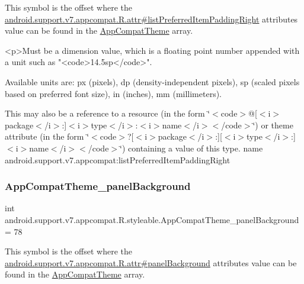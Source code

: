 This symbol is the offset where the \hyperlink{classandroid_1_1support_1_1v7_1_1appcompat_1_1R_1_1attr_a84cb41529bc5b6350af5f41bbea4e8cd}{android.\+support.\+v7.\+appcompat.\+R.\+attr\#list\+Preferred\+Item\+Padding\+Right} attribute\textquotesingle{}s value can be found in the \hyperlink{classandroid_1_1support_1_1v7_1_1appcompat_1_1R_1_1styleable_a5c42f89e8a410c323be34208d75c430b}{App\+Compat\+Theme} array.

\begin{DoxyVerb}      <p>Must be a dimension value, which is a floating point number appended with a unit such as "<code>14.5sp</code>".
\end{DoxyVerb}
 Available units are\+: px (pixels), dp (density-\/independent pixels), sp (scaled pixels based on preferred font size), in (inches), mm (millimeters). 

This may also be a reference to a resource (in the form \char`\"{}$<$code$>$@\mbox{[}$<$i$>$package$<$/i$>$\+:\mbox{]}$<$i$>$type$<$/i$>$\+:$<$i$>$name$<$/i$>$$<$/code$>$\char`\"{}) or theme attribute (in the form \char`\"{}$<$code$>$?\mbox{[}$<$i$>$package$<$/i$>$\+:\mbox{]}\mbox{[}$<$i$>$type$<$/i$>$\+:\mbox{]}$<$i$>$name$<$/i$>$$<$/code$>$\char`\"{}) containing a value of this type.  name android.\+support.\+v7.\+appcompat\+:list\+Preferred\+Item\+Padding\+Right \mbox{\label{classandroid_1_1support_1_1v7_1_1appcompat_1_1R_1_1styleable_aa555e7cf895108969bdf9dd9d68743be}} 
\subsubsection{\texorpdfstring{App\+Compat\+Theme\+\_\+panel\+Background}{AppCompatTheme\_panelBackground}}
{\footnotesize\ttfamily int android.\+support.\+v7.\+appcompat.\+R.\+styleable.\+App\+Compat\+Theme\+\_\+panel\+Background = 78\hspace{0.3cm}{\ttfamily [static]}}

This symbol is the offset where the \hyperlink{classandroid_1_1support_1_1v7_1_1appcompat_1_1R_1_1attr_a8d488539e6d98782d46baa1724a9324b}{android.\+support.\+v7.\+appcompat.\+R.\+attr\#panel\+Background} attribute\textquotesingle{}s value can be found in the \hyperlink{classandroid_1_1support_1_1v7_1_1appcompat_1_1R_1_1styleable_a5c42f89e8a410c323be34208d75c430b}{App\+Compat\+Theme} array.

